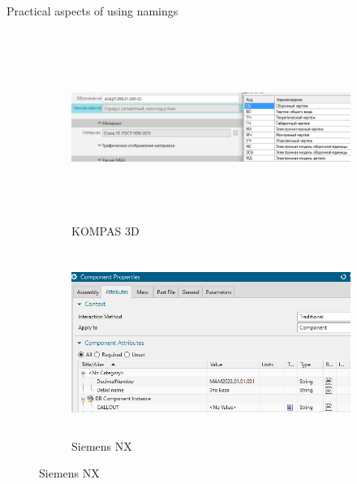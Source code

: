 \documentclass[aspectratio=169]{beamer}
\begin{document}
\begin{frame}[t]{Practical aspects of using namings}
    \framesubtitle{}
    \begin{figure}[H]
        \begin{subfigure}[c]{0.49\textwidth}
            \centering\includegraphics[height=6cm,width=1\textwidth,keepaspectratio]{name_3.png}
            \caption*{KOMPAS 3D}
            \label{fig:name_3.png}
        \end{subfigure}
        \begin{subfigure}[c]{0.49\textwidth}
            \centering\includegraphics[height=6cm,width=1\textwidth,keepaspectratio]{name_4.png}
            \caption*{Siemens NX}
            \label{fig:name_4.png}
        \end{subfigure}
    \end{figure}
\end{frame}
\end{document}
